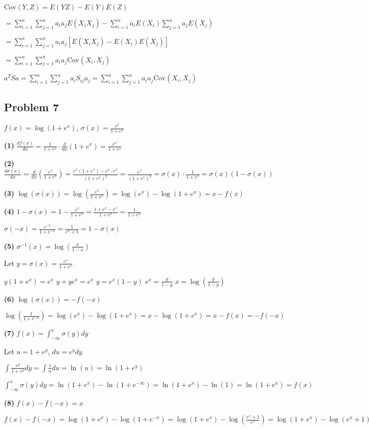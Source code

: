 \documentclass{article}
\begin{document}
$\text{Cov}(Y,Z) = E(YZ) - E(Y)E(Z)$

$= \sum_{i=1}^n \sum_{j=1}^n a_i a_j E(X_i X_j) - \sum_{i=1}^n a_i E(X_i) \sum_{j=1}^n a_j E(X_j)$

$= \sum_{i=1}^n \sum_{j=1}^n a_i a_j [E(X_i X_j) - E(X_i)E(X_j)]$

$= \sum_{i=1}^n \sum_{j=1}^n a_i a_j \text{Cov}(X_i, X_j)$

$a^T S a = \sum_{i=1}^n \sum_{j=1}^n a_i S_{ij} a_j = \sum_{i=1}^n \sum_{j=1}^n a_i a_j \text{Cov}(X_i, X_j)$

\subsection*{Problem 7}
$f(x) = \log(1 + e^x)$, $\sigma(x) = \frac{e^x}{1 + e^x}$

\textbf{(1)} $\frac{d f(x)}{dx} = \frac{1}{1+e^x} \cdot \frac{d}{dx}(1+e^x) = \frac{e^x}{1+e^x}$

\textbf{(2)} $\frac{d\sigma(x)}{dx} = \frac{d}{dx}\left(\frac{e^x}{1+e^x}\right) = \frac{e^x(1+e^x) - e^x \cdot e^x}{(1+e^x)^2} = \frac{e^x}{(1+e^x)^2} = \sigma(x) \cdot \frac{1}{1+e^x} = \sigma(x)(1-\sigma(x))$

\textbf{(3)} $\log(\sigma(x)) = \log\left(\frac{e^x}{1+e^x}\right) = \log(e^x) - \log(1+e^x) = x - f(x)$

\textbf{(4)} $1-\sigma(x) = 1 - \frac{e^x}{1+e^x} = \frac{1+e^x-e^x}{1+e^x} = \frac{1}{1+e^x}$

$\sigma(-x) = \frac{e^{-x}}{1+e^{-x}} = \frac{1}{e^x+1} = 1-\sigma(x)$

\textbf{(5)} $\sigma^{-1}(x) = \log\left(\frac{x}{1-x}\right)$

Let $y = \sigma(x) = \frac{e^x}{1+e^x}$

$y(1+e^x) = e^x$
$y + ye^x = e^x$
$y = e^x(1-y)$
$e^x = \frac{y}{1-y}$
$x = \log\left(\frac{y}{1-y}\right)$

\textbf{(6)} $\log(\sigma(x)) = -f(-x)$

$\log\left(\frac{1}{1+e^{-x}}\right) = \log(e^x) - \log(1+e^x) = x - \log(1+e^x) = x - f(x) = -f(-x)$

\textbf{(7)} $f(x) = \int_{-\infty}^x \sigma(y) dy$

Let $u = 1+e^y$, $du = e^y dy$

$\int \frac{e^y}{1+e^y} dy = \int \frac{1}{u} du = \ln(u) = \ln(1+e^y)$

$\int_{-\infty}^x \sigma(y) dy = \ln(1+e^x) - \ln(1+e^{-\infty}) = \ln(1+e^x) - \ln(1) = \ln(1+e^x) = f(x)$

\textbf{(8)} $f(x) - f(-x) = x$

$f(x) - f(-x) = \log(1+e^x) - \log(1+e^{-x}) = \log(1+e^x) - \log\left(\frac{e^x+1}{e^x}\right) = \log(1+e^x) - \log(e^x+1) + x = x$
\end{document}
